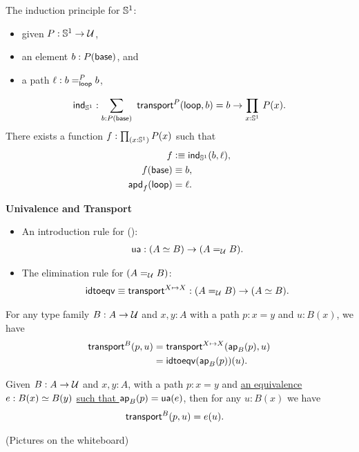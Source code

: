 \documentclass[centering]{report}
\newenvironment{slide}
    {\newpage
    \vspace*{\fill}
    }
    {
     \vspace*{\fill}
    }
\begin{document}
\begin{slide}
The induction principle for $\Sn^1$:
\begin{itemize}
\item given $P:\Sn^1\to\type$,
\item an element $b:P(\base)$, and
\item a path $\ell : \dpath P \lloop b b$,
\end{itemize}
\begin{align*}
  \mathsf{ind}_{\Sn^1} : \sm{b:P(\base)}\, \transfib{P}{\lloop}{b} = b \to \prd{x:\Sn^1} P(x).
\end{align*}
There exists a function $f : \prd{x:\Sn^1} P(x)$ such that
\begin{align*}
f &\defeq \mathsf{ind}_{\Sn^1} (b,\ell),\\
f(\base) &\jdeq b,\\
\apd f \lloop &= \ell.
\end{align*}
\end{slide}

\begin{slide}
\textbf{Univalence and Transport}

{\color{gray}
\everymath{\color{gray}}
\begin{itemize}
\item An introduction rule for {()}:
\begin{align*}
  \ua : ({\eqv A B}) \to (\id[\type]{A}{B}).
\end{align*}
\item The elimination rule for $(\id[\type]{A}{B})$:
\begin{align*}
  \idtoeqv \jdeq \transfibf{X \mapsto X} : (\id[\type]{A}{B}) \to (\eqv A B).
\end{align*}
\end{itemize}

\begin{lem}\label{thm:transport-is-ap}
  For any type family $B:A\to\type$ and $x,y:A$ with a path $p:x=y$ and $u:B(x)$, we have
  \begin{align*}
    \transfib{B}{p}{u} &= \transfib{X\mapsto X}{\apfunc{B}(p)}{u}\\
    &= \idtoeqv(\apfunc{B}(p))(u).
  \end{align*}
\end{lem}
}
\begin{lem}\label{thm:transport-is-given}
  Given $B:A\to\type$ and $x,y:A$, with a path $p:x=y$ and
  \underline{\color{black}an equivalence $e:\eqv{B(x)}{B(y)}$}
  \underline{\color{black}such that $\apfunc{B}(p) = \ua(e)$}, then for any $u:B(x)$ we have
  \begin{align*}
    \transfib{B}{p}{u} &= e(u).
  \end{align*}
\end{lem}
{\color{gray}(Pictures on the whiteboard)}
\end{slide}
\end{document}
